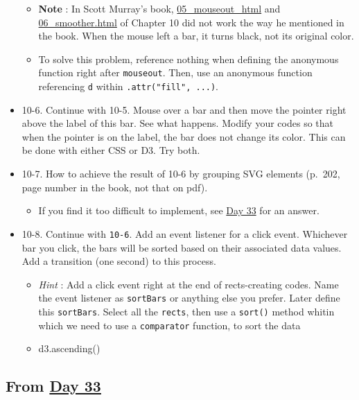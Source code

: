 \documentclass[
]{book}
\providecommand{\tightlist}{%
  \setlength{\itemsep}{0pt}\setlength{\parskip}{0pt}}
\begin{document}
\begin{itemize}
  \begin{itemize}
  \item
    \textbf{Note} : In Scott Murray's book, \href{https://github.com/scotthmurray/d3-book/blob/master/chapter_10/05_mouseout.html}{05\_mouseout\_html} and \href{https://github.com/scotthmurray/d3-book/blob/master/chapter_10/06_smoother.html}{06\_smoother.html} of Chapter 10 did not work the way he mentioned in the book. When the mouse left a bar, it turns black, not its original color.
  \item
    To solve this problem, reference nothing when defining the anonymous function right after \texttt{mouseout}. Then, use an anonymous function referencing \texttt{d} within \texttt{.attr("fill",\ ...)}.
  \end{itemize}
\item
  10-6. Continue with 10-5. Mouse over a bar and then move the pointer right above the label of this bar. See what happens. Modify your codes so that when the pointer is on the label, the bar does not change its color. This can be done with either CSS or D3. Try both.
\item
  10-7. How to achieve the result of 10-6 by grouping SVG elements (p.~202, page number in the book, not that on pdf).

  \begin{itemize}
  \tightlist
  \item
    If you find it too difficult to implement, see \href{https://observablehq.com/@hongtaoh/day-33-2020-09-26}{Day 33} for an answer.
  \end{itemize}
\item
  10-8. Continue with \texttt{10-6}. Add an event listener for a click event. Whichever bar you click, the bars will be sorted based on their associated data values. Add a transition (one second) to this process.

  \begin{itemize}
  \item
    \emph{Hint} : Add a click event right at the end of rects-creating codes. Name the event listener as \texttt{sortBars} or anything else you prefer. Later define this \texttt{sortBars}. Select all the \texttt{rects}, then use a \texttt{sort()} method whitin which we need to use a \texttt{comparator} function, to sort the data
  \item
    d3.ascending()
  \end{itemize}
\end{itemize}

\hypertarget{from-day-33}{%
\subsection{\texorpdfstring{From \href{https://observablehq.com/@hongtaoh/day-33-2020-09-26}{Day 33}}{From Day 33}}\label{from-day-33}}
\end{document}
